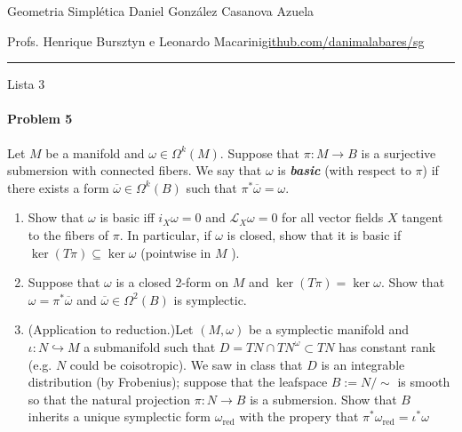 
%



\begin{minipage}{\textwidth}
	\begin{minipage}{1\textwidth}
		Geometria Simpl\'etica \hfill Daniel González Casanova Azuela
		
		{\small Profs. Henrique Bursztyn e Leonardo Macarini\hfill\href{https://github.com/danimalabares/sg}{github.com/danimalabares/sg}}
	\end{minipage}
\end{minipage}\vspace{.2cm}\hrule

\vspace{10pt}
{\huge Lista 3}

\paragraph{Problem 5} Let $M$ be a manifold and $\omega\in\Omega^{k}(M)$. Suppose that $\pi:M\to B$ is a surjective submersion with connected fibers. 
We say that $\omega$ is \textit{\textbf{basic}} (with respect to $\pi$) if there exists a form $\overline{\omega} \in \Omega^{k}(B)$ such that $\pi^*\overline{\omega} =\omega$.
\begin{enumerate}[label=\alph*.]
	\item Show that $\omega$ is basic iff $i_X\omega=0$ and $\mathcal{L}_{X}\omega=0$ for all vector fields $X$ tangent to the fibers of $\pi$. In particular, if $\omega$ is closed, show that it is basic if $\ker(T\pi)\subseteq\ker \omega$ (pointwise in $M$ ).

		\item Suppose that $\omega$ is a closed 2-form on $M$ and $\ker(T\pi)=\ker \omega$. Show that $\omega=\pi^*\overline{\omega}$ and $\overline{\omega}\in\Omega^{2}(B)$ is symplectic.

		\item {\color{6}(Application to reduction.)}\hspace{0.5em}Let $(M,\omega)$ be a symplectic manifold and $\iota:N\hookrightarrow M$ a submanifold such that $D=TN\cap T N^\omega\subset T N$ has constant rank (e.g. $N$ could be coisotropic). We saw in class that $D$ is an integrable distribution (by Frobenius); suppose that the leafspace $B:=N/\sim$ is smooth so that the natural projection $\pi:N\longrightarrow B$ is a submersion. Show that $B$ inherits a unique symplectic form $\omega_{\operatorname{red}}$ with the propery that $\pi^*\omega_{\operatorname{red}}=\iota ^*\omega$
\end{enumerate}

